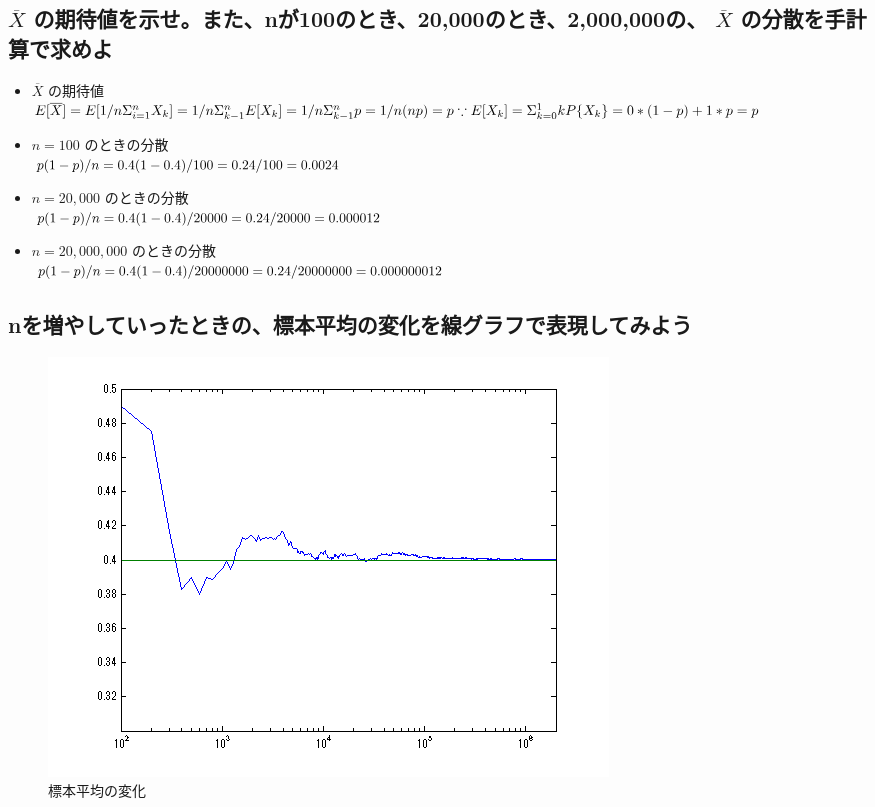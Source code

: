 \documentclass{scrartcl}
\begin{document}
\subsection{\(\overline{X}\) の期待値を示せ。また、nが100のとき、20,000のとき、2,000,000の、 \(\overline{X}\) の分散を手計算で求めよ}
\label{sec:orgc190c0f}
\begin{itemize}
\item \(\overline{X}\) の期待値\\
\(E[\overline{X}]
     = E[1/n{\Sigma^{n}_{i=1}{X_k}}] \\
     = 1/n {\Sigma^{n}_{k-1}E[X_k]} \\
     = 1/n {\Sigma^{n}_{k-1}p}\\
     = 1/n (n p) \\
     = p \\
     \because
     E[X_k]
     = \Sigma_{k=0}^{1}kP\{X_k\} \\ 
     = 0 * (1-p) + 1 * p \\
     = p\)\\
\item \(n = 100\) のときの分散\\
\(p(1-p)/n
     = 0.4(1-0.4)/100 \\
     = 0.24/100 \\
     = 0.0024\)\\
\item \(n = 20,000\) のときの分散\\
\(p(1-p)/n
     = 0.4(1-0.4)/20000 \\
     = 0.24/20000 \\
     = 0.000012\)     \\
\item \(n = 20,000,000\) のときの分散\\
\(p(1-p)/n
     = 0.4(1-0.4)/20000000 \\
     = 0.24/20000000 \\
     = 0.000000012\)          \\
\end{itemize}
\subsection{nを増やしていったときの、標本平均の変化を線グラフで表現してみよう}
\label{sec:org8b607b4}
\begin{figure}[htbp]
\centering
\includegraphics[width=0.5\linewidth]{./kadai/k2/k22.png}
\caption{標本平均の変化}
\end{figure}
\end{document}
